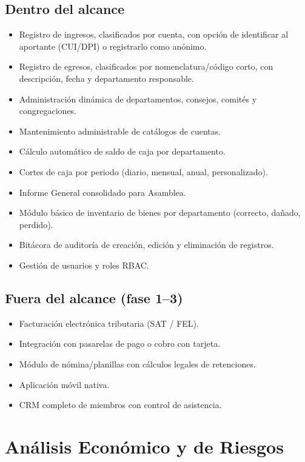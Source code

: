 \documentclass[11pt,a4paper]{article}
\begin{document}
	\subsection{Dentro del alcance}
	\begin{itemize}
		\item Registro de ingresos, clasificados por cuenta, con opción de identificar al aportante (CUI/DPI) o registrarlo como anónimo.
		\item Registro de egresos, clasificados por nomenclatura/código corto, con descripción, fecha y departamento responsable.
		\item Administración dinámica de departamentos, consejos, comités y congregaciones.
		\item Mantenimiento administrable de catálogos de cuentas.
		\item Cálculo automático de saldo de caja por departamento.
		\item Cortes de caja por periodo (diario, mensual, anual, personalizado).
		\item Informe General consolidado para Asamblea.
		\item Módulo básico de inventario de bienes por departamento (correcto, dañado, perdido).
		\item Bitácora de auditoría de creación, edición y eliminación de registros.
		\item Gestión de usuarios y roles RBAC.
	\end{itemize}
	
	\subsection{Fuera del alcance (fase 1–3)}
	\begin{itemize}
		\item Facturación electrónica tributaria (SAT / FEL).
		\item Integración con pasarelas de pago o cobro con tarjeta.
		\item Módulo de nómina/planillas con cálculos legales de retenciones.
		\item Aplicación móvil nativa.
		\item CRM completo de miembros con control de asistencia.
	\end{itemize}
	

	\section{Análisis Económico y de Riesgos}
	
\end{document}

